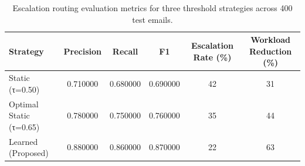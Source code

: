 \begin{table}
\caption{Escalation routing evaluation metrics for three threshold strategies across 400 test emails.}
\label{tab:tab04_escalation_strategies}
\begin{tabular}{lccccc}
\toprule
Strategy & Precision & Recall & F1 & Escalation Rate (\%) & Workload Reduction (\%) \\
\midrule
Static (τ=0.50) & 0.710000 & 0.680000 & 0.690000 & 42 & 31 \\
Optimal Static (τ=0.65) & 0.780000 & 0.750000 & 0.760000 & 35 & 44 \\
Learned (Proposed) & 0.880000 & 0.860000 & 0.870000 & 22 & 63 \\
\bottomrule
\end{tabular}
\end{table}
